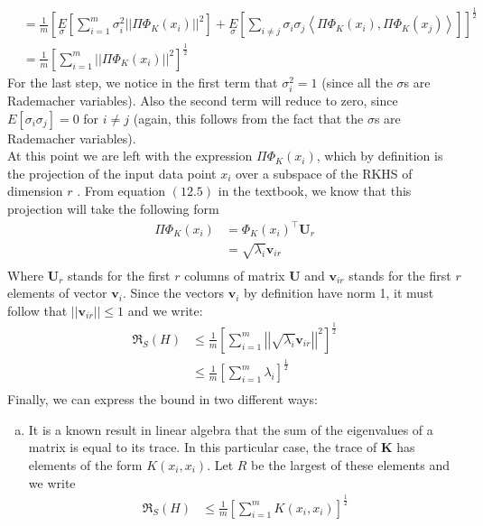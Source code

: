 \documentclass{article}
\newcommand{\R}{\mathfrak{R}}
\begin{document}
\begin{enumerate}
\begin{align*}
    &= \frac{1}{m}\left[\underset{\sigma}{E}\left[\sum_{i=1}^{m}\sigma_i^2\left|\left|\Pi \Phi_{K}(x_i) \right|\right|^2\right] + \underset{\sigma}{E}\left[ \sum_{i\neq j}\sigma_i \sigma_j \left\langle \Pi \Phi_{K}(x_i),  \Pi \Phi_{K}(x_j) \right\rangle\right]\right]^{\frac{1}{2}}\\
    &= \frac{1}{m}\left[\sum_{i=1}^{m}\left|\left|\Pi \Phi_{K}(x_i) \right|\right|^2\right]^{\frac{1}{2}}
\end{align*}
For the last step, we notice in the first term that $\sigma_i^2=1$ (since all the $\sigma$s are Rademacher variables). Also the second term will reduce to zero, since $E[\sigma_i\sigma_j]=0$ for $i\neq j$ (again, this follows from the fact that the $\sigma$s are Rademacher variables).\\
At this point we are left with the expression $\Pi \Phi_{K}(x_i)$, which by definition is the projection of the input data point $x_i$ over a subspace of the RKHS of dimension $r$ . From equation $(12.5)$ in the textbook, we know that this projection will take the following form
\begin{align*}
    \Pi \Phi_{K}(x_i) &= \Phi_{K}(x_i)^{\top}\mathbf{U}_r\\
    &= \sqrt{\lambda_i}\mathbf{v}_{ir}\\
\end{align*}
Where $\mathbf{U}_r$ stands for the first $r$ columns of matrix $\mathbf{U}$ and $\mathbf{v}_{ir}$ stands for the first $r$ elements of vector $\mathbf{v}_{i}$. Since the vectors $\mathbf{v}_{i}$ by definition have norm 1, it must follow that $||\mathbf{v}_{ir}|| \leq 1$ and we write:
\begin{align*}
    \R_S(H) &\leq \frac{1}{m}\left[\sum_{i=1}^{m}\left|\left|\sqrt{\lambda_i}\mathbf{v}_{ir} \right|\right|^2\right]^{\frac{1}{2}} \\
    &\leq \frac{1}{m}\left[\sum_{i=1}^{m}\lambda_i\right]^{\frac{1}{2}} \\
\end{align*}
Finally, we can express the bound in two different ways:
    \begin{enumerate}[(a)]
        \item It is a known result in linear algebra that the sum of the eigenvalues of a matrix is equal to its trace. In this particular case, the trace of $\mathbf{K}$ has elements of the form $K(x_i,x_i)$. Let $R$ be the largest of these elements and we write
        \begin{align*}
            \R_S(H) &\leq \frac{1}{m}\left[\sum_{i=1}^{m}K(x_i,x_i)\right]^{\frac{1}{2}} \\

\end{align*}
\end{enumerate}
\end{enumerate}
\end{document}
